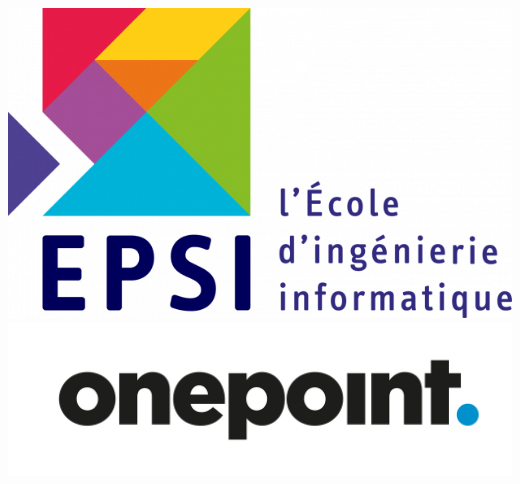 \begin{titlepage}
\includegraphics[scale=0.2]{img/epsi.png}\\[1cm] %

\includegraphics[scale=0.05]{img/onepoint.png}\\[1cm] %
 
\vfill %

\end{titlepage}